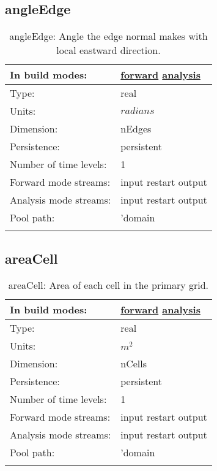 \subsection[angleEdge]{angleEdge}
\label{subsec:var_sec_mesh_angleEdge}
\begin{center}
\begin{longtable}{| p{2.0in} | p{4.0in} |}
        \hline 
        In build modes: & \hyperref[subsec:forward_var_tab_mesh]{forward} \hyperref[subsec:analysis_var_tab_mesh]{analysis} \\
        \hline 
        Type: & real \\
        \hline 
        Units: & $radians$ \\
        \hline 
        Dimension: & nEdges \\
        \hline 
        Persistence: & persistent \\
        \hline 
        Number of time levels: & 1 \\
        \hline 
		 Forward mode streams: &  input restart output \\
        \hline 
		 Analysis mode streams: &  input restart output \\
        \hline 
            Pool path: & 'domain %
 \\
		 \hline 
    \caption{angleEdge: Angle the edge normal makes with local eastward direction.}
\end{longtable}
\end{center}
\subsection[areaCell]{areaCell}
\label{subsec:var_sec_mesh_areaCell}
\begin{center}
\begin{longtable}{| p{2.0in} | p{4.0in} |}
        \hline 
        In build modes: & \hyperref[subsec:forward_var_tab_mesh]{forward} \hyperref[subsec:analysis_var_tab_mesh]{analysis} \\
        \hline 
        Type: & real \\
        \hline 
        Units: & $m^2$ \\
        \hline 
        Dimension: & nCells \\
        \hline 
        Persistence: & persistent \\
        \hline 
        Number of time levels: & 1 \\
        \hline 
		 Forward mode streams: &  input restart output \\
        \hline 
		 Analysis mode streams: &  input restart output \\
        \hline 
            Pool path: & 'domain %
 \\
		 \hline 
    \caption{areaCell: Area of each cell in the primary grid.}
\end{longtable}
\end{center}
